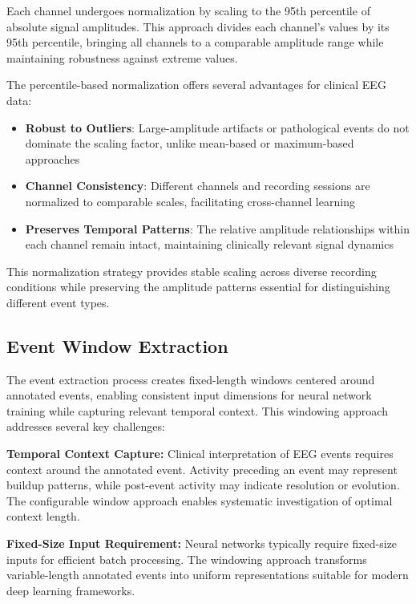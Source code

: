 Each channel undergoes normalization by scaling to the 95th percentile of absolute signal amplitudes. This approach divides each channel's values by its 95th percentile, bringing all channels to a comparable amplitude range while maintaining robustness against extreme values.

The percentile-based normalization offers several advantages for clinical \ac{EEG} data:

\begin{itemize}
    \item \textbf{Robust to Outliers}: Large-amplitude artifacts or pathological events do not dominate the scaling factor, unlike mean-based or maximum-based approaches
    \item \textbf{Channel Consistency}: Different channels and recording sessions are normalized to comparable scales, facilitating cross-channel learning
    \item \textbf{Preserves Temporal Patterns}: The relative amplitude relationships within each channel remain intact, maintaining clinically relevant signal dynamics
\end{itemize}

This normalization strategy provides stable scaling across diverse recording conditions while preserving the amplitude patterns essential for distinguishing different event types.

\subsection{Event Window Extraction}
\label{sec:event_windows}

The event extraction process creates fixed-length windows centered around annotated events, enabling consistent input dimensions for neural network training while capturing relevant temporal context. This windowing approach addresses several key challenges:

\textbf{Temporal Context Capture:} Clinical interpretation of \ac{EEG} events requires context around the annotated event. Activity preceding an event may represent buildup patterns, while post-event activity may indicate resolution or evolution. The configurable window approach enables systematic investigation of optimal context length.

\textbf{Fixed-Size Input Requirement:} Neural networks typically require fixed-size inputs for efficient batch processing. The windowing approach transforms variable-length annotated events into uniform representations suitable for modern deep learning frameworks.

